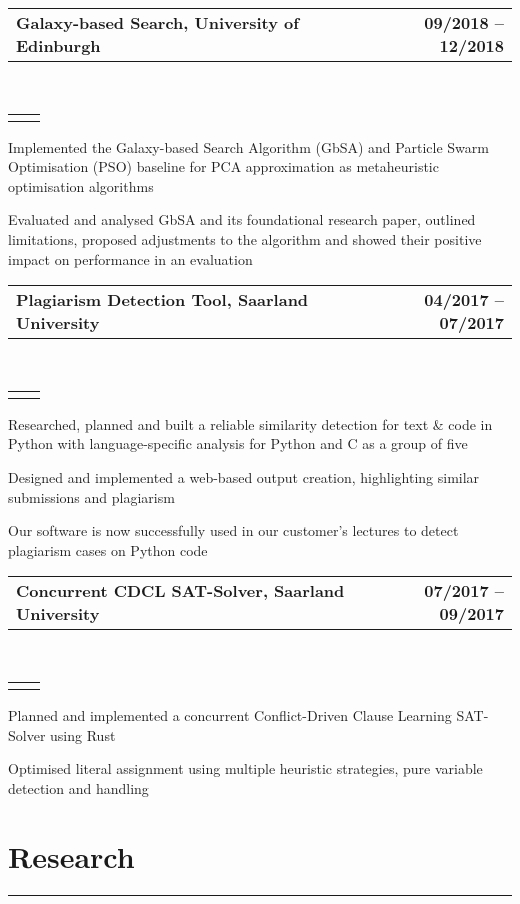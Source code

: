 \documentclass[]{deedy-resume}
\makeatletter
\newcommand{\headerrow}[2]
{\begin{tabular*}{\linewidth}{l@{\extracolsep{\fill}}r}
	\fontspec{Helvetica}\fontsize{12pt}{12pt}\selectfont\bfseries{\color{subheadings}#1} &
	\fontspec{Helvetica}\fontsize{12pt}{12pt}\selectfont\bfseries{\color{subheadings}#2} \\
\end{tabular*}}
\newcommand{\locationrow}[2]
{\begin{tabular*}{\linewidth}{l@{\extracolsep{\fill}}r}
        \color{headings}\scshape\fontspec{Heiti TC Medium}\fontsize{10pt}{12pt}\selectfont{#1}  &
        \color{headings}\scshape\fontspec{Heiti TC Medium}\fontsize{10pt}{12pt}\selectfont{#2}  \\
\end{tabular*}}
\makeatother
\begin{document}
\noindent
\headerrow{Galaxy-based Search, University of Edinburgh}{09/2018 -- 12/2018}
\\
\locationrow{Group Project for Natural Computing Lecture}{}
\begin{tightitemize}{1.7em}
    \item Implemented the Galaxy-based Search Algorithm (GbSA) and Particle Swarm Optimisation (PSO) baseline 
    for PCA approximation as metaheuristic optimisation algorithms
    \item Evaluated and analysed GbSA and its foundational research paper, outlined limitations, proposed adjustments to 
    the algorithm and showed their positive impact on performance in an evaluation
\end{tightitemize}
\largesectionsep

\newpage
\noindent
\headerrow{Plagiarism Detection Tool, Saarland University}{04/2017 -- 07/2017}
\\
\locationrow{Group Project for Software Engineering Lecture}{}
\begin{tightitemize}{1.7em}
    \item Researched, planned and built a reliable similarity detection for text \& code in Python with language-specific analysis for Python and C as a group of five
    \item Designed and implemented a web-based output creation, highlighting similar submissions and plagiarism
    \item Our software is now successfully used in our customer's lectures to detect plagiarism cases on Python code
\end{tightitemize}
\largesectionsep

\noindent
\headerrow{Concurrent CDCL SAT-Solver, Saarland University}{07/2017 -- 09/2017}
\\
\locationrow{Group Project for Modern Imperative Programming Languages Seminar}{}
\begin{tightitemize}{1.7em}
    \item Planned and implemented a concurrent Conflict-Driven Clause Learning SAT-Solver using Rust
    \item Optimised literal assignment using multiple heuristic strategies, pure variable detection and handling
\end{tightitemize}
\largesectionsep


\section*{Research}
\hrule
\vspace{0.4em}
\end{document}
